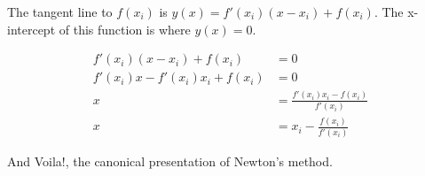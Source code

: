The tangent line to $f(x_i)$ is $y(x) = f'(x_i) (x - x_i) + f(x_i)$.
The x-intercept of this function is where $y(x) = 0$. 

\begin{align*}
f'(x_i) (x - x_i) + f(x_i) &= 0 \\
f'(x_i) x - f'(x_i) x_i + f(x_i) &= 0 \\
x &= \frac{f'(x_i) x_i - f(x_i)}{f'(x_i)} \\
x &= x_i - \frac{f(x_i)}{f'(x_i)}
\end{align*}

And Voila!, the canonical presentation of Newton's method.
